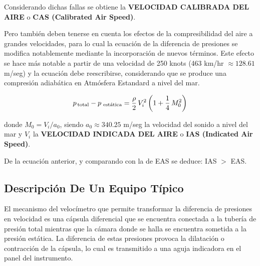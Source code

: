 \documentclass[a4paper,12pt,twoside]{article}
\begin{document}
Considerando dichas fallas se obtiene la {\bf VELOCIDAD CALIBRADA DEL AIRE} 
o {\bf CAS (Calibrated Air Speed)}.

Pero tambi\'en deben tenerse en cuenta los efectos de la compresibilidad del aire a grandes velocidades, para lo cual la ecuación de la diferencia de presiones se modifica notablemente mediante la incorporación de nuevos términos. Este efecto se hace más notable a partir de una velocidad de 
250 knots (463 km/hr $\approx 128.61$ m/seg) 
y la ecuación debe reescribirse, considerando que se produce una compresión adiabática en Atmósfera Estandard a nivel del mar.

\begin{equation*}
	p_{\text{\,total}}   - p_{\text{ est\'atica}} = \displaystyle \frac{\rho}{2} \, V_i^2 
	\left( 1 + \frac{1}{4}\,M_0^2
	\right)
\end{equation*}

donde $M_0 = V_i/a_0$, siendo $a_0 \approx 340.25 $ m/seg la  velocidad del sonido a nivel del mar 
y $V_i$ la {\bf VELOCIDAD INDICADA DEL AIRE}  o {\bf IAS (Indicated Air Speed)}. 

De la ecuación anterior, y comparando con la de EAS se deduce: IAS $>$ EAS.

\subsection{Descripción De Un Equipo Típico}
\label{sec:velocimetro.descripcion.equipo.tipico}

El mecanismo del velocímetro que permite transformar la diferencia de presiones en velocidad es una cápsula diferencial que se encuentra conectada a la tubería de presión total mientras que la cámara donde se halla se encuentra sometida a la presión estática. La diferencia de estas presiones provoca la dilatación o contracción de la cápsula, lo cual es transmitido a una aguja indicadora en el panel del instrumento.
\end{document}
